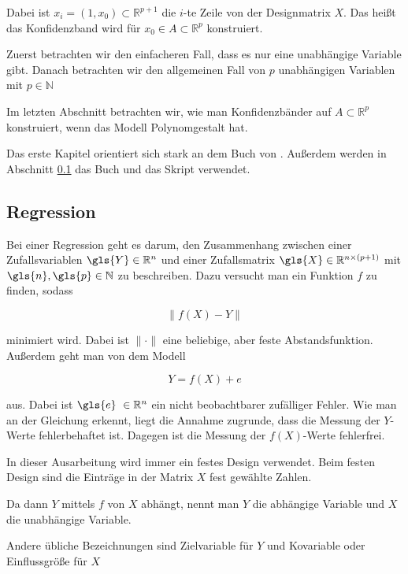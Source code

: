 \documentclass[12pt,a4paper]{article}
\theoremstyle{definition}
\theoremstyle{definition}
\theoremstyle{definition}
\theoremstyle{definition}
\begin{document}
Dabei ist $x_i = (1, x_{0}) \subset \mathbb{R}^{p+1}$ die $i$-te Zeile von der Designmatrix $X$. Das heißt das Konfidenzband wird für $x_{0} \in A \subset \mathbb{R}^p$ konstruiert.

Zuerst betrachten wir den einfacheren Fall, dass es nur eine unabhängige Variable gibt. Danach betrachten wir den allgemeinen Fall von $p$ unabhängigen Variablen mit $p \in \mathbb{N} $

Im letzten Abschnitt betrachten wir, wie man Konfidenzbänder auf $A \subset \mathbb{R}^p$ konstruiert, wenn das Modell Polynomgestalt hat.

Das erste Kapitel orientiert sich stark an dem Buch von \cite{Liu64}. Außerdem werden in Abschnitt \ref{Regression} das Buch \cite{Georgii09} und das Skript \cite{Kriv15} verwendet.


\subsection{Regression}
\label{Regression}
Bei einer Regression geht es darum, den Zusammenhang zwischen einer Zufallsvariablen $\gls{Y} \in \mathbb{R}^n$ und einer Zufallsmatrix $\gls{X} \in \mathbb{R}^{n \times (p+1)}$ mit $\gls{n}, \gls{p} \in \mathbb{N}$ zu beschreiben. Dazu versucht man ein Funktion $f$ zu finden, sodass

\begin{equation*}
\| f(X) - Y \|
\end{equation*}

minimiert wird. Dabei ist $ \| \cdot \|$ eine beliebige, aber feste Abstandsfunktion. Außerdem geht man von dem Modell

\begin{equation*}
Y = f(X) + e
\end{equation*}

aus. Dabei ist $\gls{e} ~ \in \mathbb{R}^n$ ein nicht beobachtbarer zufälliger Fehler. Wie man an der Gleichung erkennt, liegt die Annahme zugrunde, dass die Messung der $Y$-Werte fehlerbehaftet ist.
Dagegen ist die Messung der $f(X)$-Werte fehlerfrei.

In dieser Ausarbeitung wird immer ein festes Design verwendet. Beim festen Design sind die Einträge in der Matrix $X$ fest gewählte Zahlen.

Da dann $Y$ mittels $f$ von $X$ abhängt, nennt man $Y$ die abhängige Variable und $X$ die unabhängige Variable. 

Andere übliche Bezeichnungen sind Zielvariable für $Y$ und Kovariable oder Einflussgröße für $X$
\end{document}
